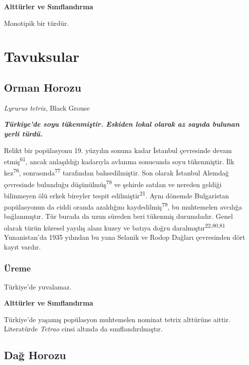 \documentclass[
  letterpaper,
  DIV=11,
  numbers=noendperiod]{scrreprt}
\begin{document}
\textbf{Alttürler ve Sınıflandırma}

Monotipik bir türdür.


\hypertarget{tavuksular}{%
\chapter{Tavuksular}\label{tavuksular}}

\hypertarget{orman-horozu}{%
\section{Orman Horozu}\label{orman-horozu}}

\emph{Lyrurus tetrix}, Black Grouse

\textbf{\emph{Türkiye'de soyu tükenmiştir. Eskiden lokal olarak az
sayıda bulunan yerli türdü.}}

Relikt bir popülasyonu 19. yüzyılın sonuna kadar İstanbul çevresinde
devam etmiş\textsuperscript{61}, ancak anlaşıldığı kadarıyla avlanma
sonucunda soyu tükenmiştir. İlk kez\textsuperscript{76},
sonrasında\textsuperscript{77} tarafından bahsedilmiştir. Son olarak
İstanbul Alemdağ çevresinde bulunduğu düşünülmüş\textsuperscript{78} ve
şehirde satılan ve nereden geldiği bilinmeyen ölü erkek bireyler tespit
edilmiştir\textsuperscript{21}. Aynı dönemde Bulgaristan popülasyonun da
ciddi oranda azaldığını kaydedilmiş\textsuperscript{79}, bu muhtemelen
avcılığa bağlanmıştır. Tür burada da uzun süreden beri tükenmiş
durumdadır. Genel olarak türün küresel yayılış alanı kuzey ve batıya
doğru daralmıştır\textsuperscript{22,80,81} Yunanistan'da 1935 yılından
bu yana Selanik ve Rodop Dağları çevresinden dört kayıt vardır.

\hypertarget{uxfcreme-35}{%
\subsection{\texorpdfstring{\textbf{Üreme}}{Üreme}}\label{uxfcreme-35}}

Türkiye'de yuvalamaz.

\textbf{Alttürler ve Sınıflandırma}

Türkiye'de yaşamış popülasyon muhtemelen nominat tetrix alttürüne
aittir. Literatürde \emph{Tetrao} cinsi altında da sınıflandırılmıştır.

\hypertarget{daux11f-horozu}{%
\section{Dağ Horozu}\label{daux11f-horozu}}
\end{document}
